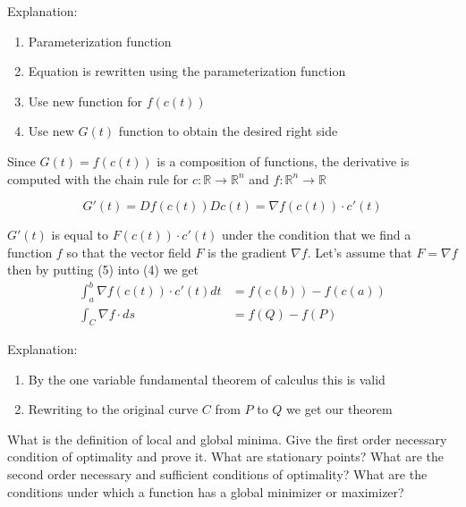 \documentclass[12pt,a4paper]{article}
\begin{document}
Explanation:
\begin{enumerate}[(1)]
    \item Parameterization function
    \item Equation is rewritten using the parameterization function
    \item Use new function for $f(c(t))$
    \item Use new $G(t)$ function to obtain the desired right side
\end{enumerate}

Since $G(t) = f(c(t))$ is a composition of functions, the derivative is computed with the chain rule for $c: \mathbb{R} \rightarrow \mathbb{R}^n$ and $f: \mathbb{R}^n \rightarrow \mathbb{R}$

\begin{equation}
    G'(t) = Df(c(t)) Dc(t) = \nabla f(c(t)) \cdot c'(t)
\end{equation}

$G'(t)$ is equal to $F(c(t)) \cdot c'(t)$ under the condition that we find a function $f$ so that the vector field $F$ is the gradient $\nabla f$. Let's assume that $F = \nabla f$ then by putting (5) into (4) we get
\begin{align}
    \int_a^b \nabla f(c(t)) \cdot c'(t) dt &= f(c(b)) - f(c(a))\\
    \int_C \nabla f \cdot ds &= f(Q) - f(P)
\end{align}

Explanation:
\begin{enumerate}[(1)]
    \item By the one variable fundamental theorem of calculus this is valid
    \item Rewriting to the original curve $C$ from $P$ to $Q$ we get our theorem
\end{enumerate}


\begin{question}
What is the definition of local and global minima. Give the first order necessary condition of optimality and prove it. What are stationary points? What are the second order necessary and sufficient conditions of optimality? What are the conditions under which a function has a global minimizer or maximizer?
\end{question}
\end{document}
